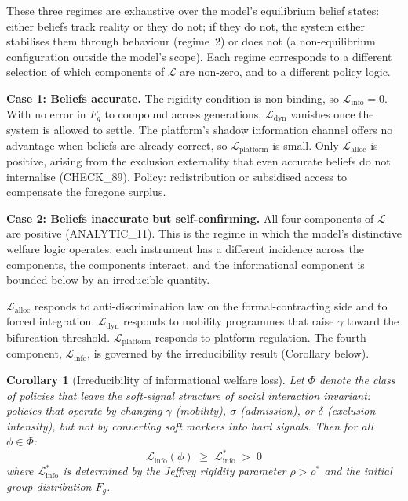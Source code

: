 \documentclass[12pt,a4paper]{article}
\newtheorem{corollary}[proposition]{Corollary}
\theoremstyle{definition}
\numberwithin{proposition}{section}
\begin{document}
These three regimes are exhaustive over the model's equilibrium
belief states: either beliefs track reality or they do not; if they
do not, the system either stabilises them through behaviour
(regime~2) or does not (a non-equilibrium configuration outside the
model's scope). Each regime corresponds to a different selection of
which components of $\mathcal{L}$ are non-zero, and to a different
policy logic.

\textbf{Case 1: Beliefs accurate.}
The rigidity condition is non-binding, so
$\mathcal{L}_{\text{info}} = 0$. With no error in $F_g$ to compound
across generations, $\mathcal{L}_{\text{dyn}}$ vanishes once the
system is allowed to settle. The platform's shadow information
channel offers no advantage when beliefs are already correct, so
$\mathcal{L}_{\text{platform}}$ is small. Only $\mathcal{L}_{\text{alloc}}$
is positive, arising from the exclusion externality that even
accurate beliefs do not internalise (CHECK\_89). Policy:
redistribution or subsidised access to compensate the foregone
surplus.

\textbf{Case 2: Beliefs inaccurate but self-confirming.}
All four components of $\mathcal{L}$ are positive
(ANALYTIC\_11). This is the regime in which the model's distinctive
welfare logic operates: each instrument has a different incidence
across the components, the components interact, and the
informational component is bounded below by an irreducible quantity.

$\mathcal{L}_{\text{alloc}}$ responds to anti-discrimination law on
the formal-contracting side and to forced integration.
$\mathcal{L}_{\text{dyn}}$ responds to mobility programmes that
raise $\gamma$ toward the bifurcation threshold.
$\mathcal{L}_{\text{platform}}$ responds to platform regulation.
The fourth component, $\mathcal{L}_{\text{info}}$, is governed by
the irreducibility result (Corollary below).

\begin{corollary}[Irreducibility of informational welfare loss]
\label{cor:irreducibility-addendum}
Let $\Phi$ denote the class of policies that leave the soft-signal
structure of social interaction invariant: policies that operate by
changing $\gamma$ (mobility), $\sigma$ (admission), or $\delta$
(exclusion intensity), but not by converting soft markers into hard
signals. Then for all $\phi \in \Phi$:
\[
  \mathcal{L}_{\mathrm{info}}(\phi)
  \;\geq\; \mathcal{L}_{\mathrm{info}}^* \;>\; 0
\]
where $\mathcal{L}_{\mathrm{info}}^*$ is determined by the Jeffrey
rigidity parameter $\rho > \rho^*$ and the initial group
distribution $F_g$.
\end{corollary}
\end{document}
